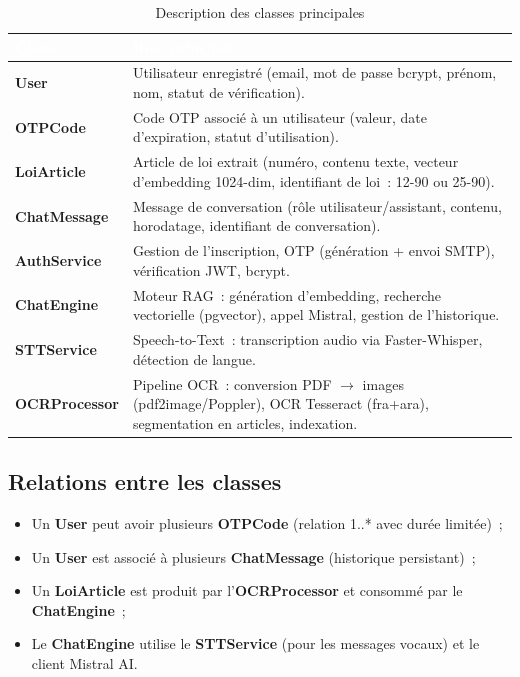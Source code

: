 \documentclass[12pt,a4paper]{report}
\begin{document}
\begin{table}[H]
\centering
\caption{Description des classes principales}
\label{tab:classes}
\renewcommand{\arraystretch}{1.3}
\begin{tabularx}{\linewidth}{>{\bfseries\small}p{3.5cm} X}
\arrayrulecolor{darkblue}\hline
\rowcolor{tableheader}\textcolor{white}{\textbf{Classe}} & \textcolor{white}{\textbf{Rôle principal}} \\
\hline
\rowcolor{tableroweven} User & Utilisateur enregistré (email, mot de passe bcrypt, prénom, nom, statut de vérification). \\
\hline
\rowcolor{tablerowodd} OTPCode & Code OTP associé à un utilisateur (valeur, date d'expiration, statut d'utilisation). \\
\hline
\rowcolor{tableroweven} LoiArticle & Article de loi extrait (numéro, contenu texte, vecteur d'embedding 1024-dim, identifiant de loi~: 12-90 ou 25-90). \\
\hline
\rowcolor{tablerowodd} ChatMessage & Message de conversation (rôle utilisateur/assistant, contenu, horodatage, identifiant de conversation). \\
\hline
\rowcolor{tableroweven} AuthService & Gestion de l'inscription, OTP (génération + envoi SMTP), vérification JWT, bcrypt. \\
\hline
\rowcolor{tablerowodd} ChatEngine & Moteur RAG~: génération d'embedding, recherche vectorielle (pgvector), appel Mistral, gestion de l'historique. \\
\hline
\rowcolor{tableroweven} STTService & Speech-to-Text~: transcription audio via Faster-Whisper, détection de langue. \\
\hline
\rowcolor{tablerowodd} OCRProcessor & Pipeline OCR~: conversion PDF $\rightarrow$ images (pdf2image/Poppler), OCR Tesseract (fra+ara), segmentation en articles, indexation. \\
\hline
\end{tabularx}
\end{table}

\subsection{Relations entre les classes}

\begin{itemize}[label=\textbullet]
    \item Un \textbf{User} peut avoir plusieurs \textbf{OTPCode} (relation 1..* avec durée limitée)~;
    \item Un \textbf{User} est associé à plusieurs \textbf{ChatMessage} (historique persistant)~;
    \item Un \textbf{LoiArticle} est produit par l'\textbf{OCRProcessor} et consommé par le \textbf{ChatEngine}~;
    \item Le \textbf{ChatEngine} utilise le \textbf{STTService} (pour les messages vocaux) et le client Mistral AI.
\end{itemize}
\end{document}
